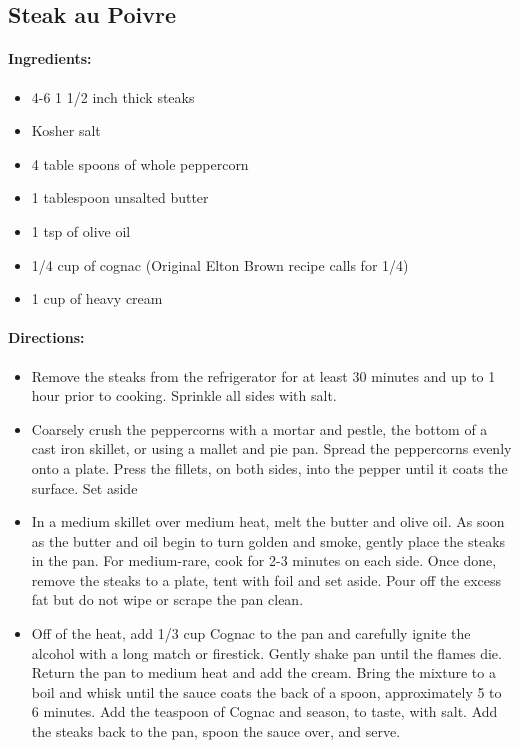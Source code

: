 \documentclass{article}
\begin{document}
\subsection{Steak au Poivre}

\paragraph{Ingredients:}

\begin{itemize}
	\item 4-6 1 1/2 inch thick steaks
	\item Kosher salt
	\item 4 table spoons of whole peppercorn
	\item 1 tablespoon unsalted butter
	\item 1 tsp of olive oil
	\item 1/4 cup of cognac (Original Elton Brown recipe calls for 1/4)
	\item 1 cup of heavy cream
\end{itemize}

\paragraph{Directions:}
\begin{itemize}
	\item Remove the steaks from the refrigerator for at least 30 minutes and up to 1 hour prior to cooking. Sprinkle all sides with salt. 
	\item Coarsely crush the peppercorns with a mortar and pestle, the bottom of a cast iron skillet, or using a mallet and pie pan. Spread the peppercorns evenly onto a plate. Press the fillets, on both sides, into the pepper until it coats the surface. Set aside
	\item In a medium skillet over medium heat, melt the butter and olive oil. As soon as the butter and oil begin to turn golden and smoke, gently place the steaks in the pan. For medium-rare, cook for 2-3 minutes on each side. Once done, remove the steaks to a plate, tent with foil and set aside. Pour off the excess fat but do not wipe or scrape the pan clean. 
	\item Off of the heat, add 1/3 cup Cognac to the pan and carefully ignite the alcohol with a long match or firestick. Gently shake pan until the flames die. Return the pan to medium heat and add the cream. Bring the mixture to a boil and whisk until the sauce coats the back of a spoon, approximately 5 to 6 minutes. Add the teaspoon of Cognac and season, to taste, with salt. Add the steaks back to the pan, spoon the sauce over, and serve.
\end{itemize}
\end{document}

